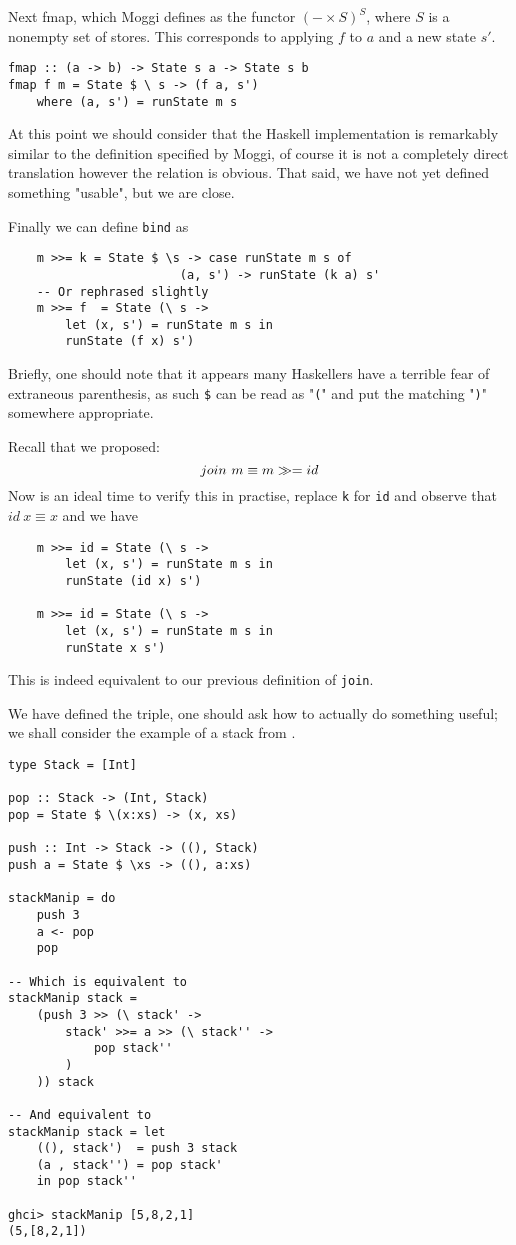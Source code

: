 Next fmap, which Moggi defines as
the functor $(-\times S)^S$,
where $S$ is a nonempty set of stores.
This corresponds to applying $f$ to $a$ and
a new state $s\prime$.
\begin{verbatim}
fmap :: (a -> b) -> State s a -> State s b
fmap f m = State $ \ s -> (f a, s')
    where (a, s') = runState m s
\end{verbatim}

At this point we should consider
that the Haskell implementation is remarkably
similar to the definition specified by Moggi,
of course it is not a completely direct translation
however the relation is obvious.
That said, we have not yet defined something "usable",
but we are close.

Finally we can define \texttt{bind} as
\begin{verbatim}
    m >>= k = State $ \s -> case runState m s of
                        (a, s') -> runState (k a) s'
    -- Or rephrased slightly
    m >>= f  = State (\ s ->
        let (x, s') = runState m s in
        runState (f x) s')
\end{verbatim}

Briefly, one should note that it appears many Haskellers
have a terrible fear of extraneous parenthesis,
as such \texttt{\$} can be read as "\texttt{(}"
and put the matching "\texttt{)}" somewhere appropriate.

Recall that we proposed:
\begin{equation}
    join\ m \equiv m \gg= id
\end{equation}
Now is an ideal time to verify this in practise,
replace \texttt{k} for \texttt{id} and
observe that $id\ x \equiv x$ and we have
\begin{verbatim}
    m >>= id = State (\ s ->
        let (x, s') = runState m s in
        runState (id x) s')

    m >>= id = State (\ s ->
        let (x, s') = runState m s in
        runState x s')
\end{verbatim}
This is indeed equivalent to our previous
definition of \texttt{join}.

We have defined the triple,
one should ask how to actually do something useful;
we shall consider the example of a stack from \cite{lipovaca2011learn}.
\begin{verbatim}
type Stack = [Int]

pop :: Stack -> (Int, Stack)
pop = State $ \(x:xs) -> (x, xs)

push :: Int -> Stack -> ((), Stack)
push a = State $ \xs -> ((), a:xs)

stackManip = do
    push 3
    a <- pop
    pop

-- Which is equivalent to
stackManip stack =
    (push 3 >> (\ stack' ->
        stack' >>= a >> (\ stack'' ->
            pop stack''
        )
    )) stack

-- And equivalent to
stackManip stack = let
    ((), stack')  = push 3 stack
    (a , stack'') = pop stack'
    in pop stack''

ghci> stackManip [5,8,2,1]
(5,[8,2,1])
\end{verbatim}

